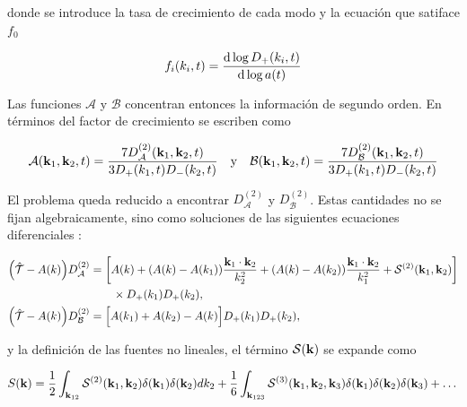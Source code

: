 \documentclass[letterpaper, 12pt]{article}
\begin{document}
            donde se introduce la tasa de crecimiento de cada modo y la ecuación que satiface $f_0$
            
            \begin{equation}
                f_i(k_i,t) = \dv{\log D_+(k_i,t)}{\log a(t)}
            \end{equation}
            
            Las funciones $\mathcal{A}$ y $\mathcal{B}$ concentran entonces la información de segundo orden. En términos del factor de crecimiento se escriben como
            
            \begin{equation}
                \mathcal{A}(\vb{k}_1,\vb{k}_2,t) = \frac{7D^{(2)}_\mathcal{A} (\vb{k}_1,\vb{k}_2,t)}{3D_+(k_1,t)D_-(k_2,t)} \qq{y} 
                \mathcal{B}(\vb{k}_1,\vb{k}_2,t) = \frac{7D^{(2)}_\mathcal{B} (\vb{k}_1,\vb{k}_2,t)}{3D_+(k_1,t)D_-(k_2,t)}
            \end{equation}
            
            El problema queda reducido a encontrar $D_\mathcal{A}^{(2)}$ y $D_\mathcal{B}^{(2)}$. Estas cantidades no se fijan algebraicamente, sino como soluciones de las siguientes ecuaciones diferenciales \cite{2}:
            
            \begin{align}
                \qty(\hat{\mathcal{T}} - A(k))D_\mathcal{A}^{(2)} 
                &= \qty[ A(k) 
                + (A(k) - A(k_1))\frac{\vb{k}_1 \cdot \vb{k}_2}{k_2^2} 
                + (A(k) - A(k_2)) \frac{\vb{k}_1 \cdot \vb{k}_2}{k_1^2} 
                + \mathcal{S}^{(2)}(\vb{k}_1, \vb{k}_2) ] \nonumber\\
                & \qq{} \times D_+(k_1) D_+(k_2), \label{eq:DA}\\
                \qty(\hat{\mathcal{T}} - A(k))D_\mathcal{B}^{(2)} &= \Big[ A(k_1) + A(k_2) - A(k) \Big] D_+(k_1)D_+(k_2), \label{eq:DB}
            \end{align}
            
            y la definición de las fuentes no lineales, el término $\mathcal{S}(\vb{k})$ se expande como
            
            \begin{equation}
                S(\vb{k}) = \frac{1}{2} \int_{\vb{k}_{12}} \mathcal{S}^{(2)}(\vb{k}_{1},\vb{k}_{2}) \delta(\vb{k}_{1}) \delta(\vb{k}_{2}) dk_{2} + \frac{1}{6} \int_{\vb{k}_{123}} \mathcal{S}^{(3)}(\vb{k}_{1},\vb{k}_{2},\vb{k}_{3}) \delta(\vb{k}_{1}) \delta(\vb{k}_{2}) \delta(\vb{k}_{3}) + \dots
            \end{equation}
        
\end{document}
